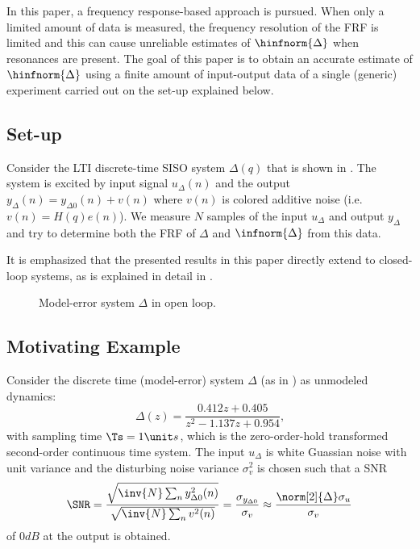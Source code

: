 In this paper, a frequency response-based approach is pursued. 
When only a limited amount of data is measured, the frequency resolution of the \gls{FRF} is limited and this can cause unreliable estimates of $\hinfnorm{\Delta}$ when resonances are present. 
The goal of this paper is to obtain an accurate estimate of $\hinfnorm{\Delta}$ using a finite amount of input-output data of a single (generic) experiment carried out on the set-up explained below.

\subsection{Set-up}
Consider the \gls{LTI} discrete-time \gls{SISO} system $\Delta(q)$ that is shown in . 
The system is excited by input signal $u_{\Delta}(n)$ and the output $y_{\Delta}(n) = y_{\Delta0}(n) + v(n)$ where $v(n)$ is colored additive noise (i.e. $v(n) = H(q)e(n)$).
We measure $N$ samples of the input $u_{\Delta}$ and output $y_{\Delta}$ and try to determine both the \gls{FRF} of $\Delta$ and $\infnorm{\Delta}$ from this data.

It is emphasized that the presented results in this paper directly extend to closed-loop systems, as is explained in detail in . 
\begin{figure}
  \centering
  
  \caption{Model-error system $\Delta$ in open loop.}
  \label{fig:DeltaOpenLoop}
\end{figure}

\subsection{Motivating Example}
\label{sec:example}
Consider the discrete time (model-error) system $\Delta$ (as in ) as unmodeled dynamics:
\begin{equation}
  \Delta(z) = \frac{0.412 z + 0.405}{z^2 - 1.137 z + 0.954}
  \label{eq:O2sysDT}
  \text{,}
\end{equation}
with  sampling time $\Ts=\TsValue$, which is the zero-order-hold transformed second-order continuous time system.
The input $u_{\Delta}$ is white Guassian noise with unit variance and the disturbing noise variance $\sigma_v^2$ is chosen such that a \gls{SNR} 
\begin{equation}
  \SNR = \frac{\sqrt{\inv{N}\sum_n y_{\Delta0}^2(n) }}%
              {\sqrt{\inv{N}\sum_n v^2(n) }}
       = \frac{\sigma_{y_{\Delta0}}}{\sigma_v}
       \approx \frac{\norm[2]{\Delta} \sigma_u}{\sigma_v}
  \label{eq:SNR}
\end{equation}
of $0\unit{dB}$ at the output is obtained.

